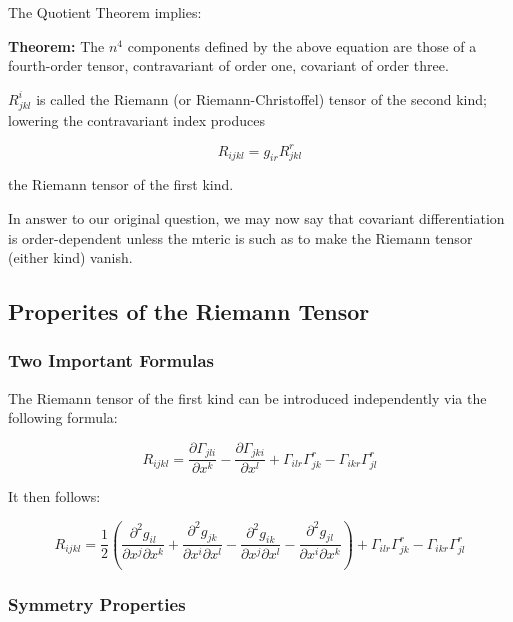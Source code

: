 \documentclass{article}
\begin{document}
The Quotient Theorem implies:

\noindent \textbf{Theorem: }
The $n^4$ components defined by the above equation are those of a fourth-order tensor, contravariant of order one, covariant of order three.

$R^i_{jkl}$ is called the Riemann (or Riemann-Christoffel) tensor of the second kind; lowering the contravariant index produces

\begin{equation}
	R_{ijkl} = g_{ir} R^r_{jkl}
\end{equation}

\noindent the Riemann tensor of the first kind.

In answer to our original question, we may now say that covariant differentiation is order-dependent unless the mteric is such as to make the Riemann tensor (either kind) vanish.

\subsection{Properites of the Riemann Tensor}

\subsubsection{Two Important Formulas}

The Riemann tensor of the first kind can be introduced independently via the following formula:

\begin{equation}
	R_{ijkl} = \frac{ \partial \Gamma_{jli} }{ \partial x^k } - \frac{ \partial \Gamma_{jki} }{ \partial x^l } + \Gamma_{ilr} \Gamma^r_{jk} - \Gamma_{ikr} \Gamma^r_{jl}
\end{equation}

\noindent It then follows:

\begin{equation}
	R_{ijkl} = \frac{ 1 }{ 2 } \left( \frac{ \partial^2 g_{il} }{ \partial x^j \partial x^k } + \frac{ \partial^2 g_{jk} }{ \partial x^i \partial x^l } - \frac{ \partial^2 g_{ik} }{ \partial x^j \partial x^l } - \frac{ \partial^2 g_{jl} }{ \partial x^i \partial x^k }\right) + \Gamma_{ilr} \Gamma^r_{jk} - \Gamma_{ikr} \Gamma^r_{jl}
\end{equation}

\subsubsection{Symmetry Properties}
\end{document}
